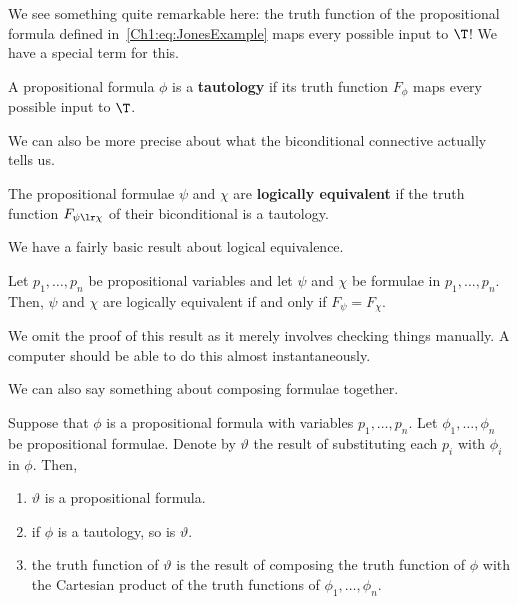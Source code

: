 \begin{boxexample}
    \sorry %
\end{boxexample}

We see something quite remarkable here: the truth function of the propositional formula defined in~\eqref{Ch1:eq:JonesExample} maps every possible input to $\T$! We have a special term for this.

\begin{boxdefinition}[Tautology]\label{Ch1:Def:Tautology}
    A propositional formula $\phi$ is a \textbf{tautology} if its truth function $F_{\phi}$ maps every possible input to $\T$.
\end{boxdefinition}

We can also be more precise about what the biconditional connective actually tells us.

\begin{boxdefinition}\label{Ch1:Def:LogicalEquivalence}
    The propositional formulae $\psi$ and $\chi$ are \textbf{logically equivalent} if the truth function $F_{\psi \lr \chi}$ of their biconditional is a tautology.
\end{boxdefinition}

We have a fairly basic result about logical equivalence.

\begin{boxlemma}
    Let $p_1, \ldots, p_n$ be propositional variables and let $\psi$ and $\chi$ be formulae in $p_1, \ldots, p_n$. Then, $\psi$ and $\chi$ are logically equivalent if and only if $F_{\psi} = F_{\chi}$.
\end{boxlemma}

We omit the proof of this result as it merely involves checking things manually. A computer should be able to do this almost instantaneously.

We can also say something about composing formulae together.

\begin{boxlemma}
    Suppose that $\phi$ is a propositional formula with variables $p_1, \ldots, p_n$. Let $\phi_1, \ldots, \phi_n$ be propositional formulae. Denote by $\vartheta$ the result of substituting each $p_i$ with $\phi_i$ in $\phi$. Then,
    \begin{enumerate}[label = \normalfont (\roman*), noitemsep]
        \item $\vartheta$ is a propositional formula.
        \item if $\phi$ is a tautology, so is $\vartheta$.
        \item the truth function of $\vartheta$ is the result of composing the truth function of $\phi$ with the Cartesian product of the truth functions of $\phi_1, \ldots, \phi_n$.
    \end{enumerate}
\end{boxlemma}

